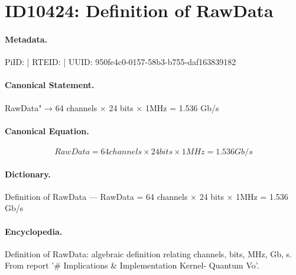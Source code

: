 \section*{ID10424: Definition of RawData}
\paragraph{Metadata.}
PiID:  | RTEID:  | UUID: 950fe4c0-0157-58b3-b755-daf163839182

\paragraph{Canonical Statement.}
RawData" → 64 channels × 24 bits × 1MHz = 1.536 Gb/s

\paragraph{Canonical Equation.}
\[
RawData = 64 channels × 24 bits × 1MHz = 1.536 Gb/s
\]

\paragraph{Dictionary.}
Definition of RawData — RawData = 64 channels × 24 bits × 1MHz = 1.536 Gb/s

\paragraph{Encyclopedia.}
Definition of RawData: algebraic definition relating channels, bits, MHz, Gb, s. From report '\# Implications \& Implementation Kernel- Quantum Vo'.
